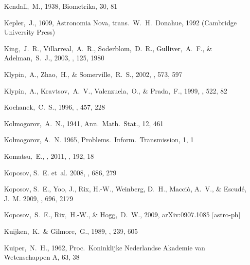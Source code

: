 \begin{thebibliography}{99}
  Kendall,~M., 1938,
  Biometrika, 30, 81

  Kepler,~J., 1609,
  Astronomia Nova,
  trans.\ W.~H.~Donahue, 1992
  (Cambridge University Press)

  King,~J.~R., Villarreal,~A.~R., Soderblom,~D.~R., Gulliver,~A.~F., \& Adelman,~S.~J., 2003,
  \aj, 125, 1980

  Klypin,~A., Zhao,~H., \& Somerville,~R.~S., 2002,
  \apj, 573, 597

  Klypin,~A., Kravtsov,~A.~V., Valenzuela,~O., \& Prada,~F., 1999, \apj, 522, 82

  Kochanek,~C.~S., 1996,
  \apj, 457, 228

  Kolmogorov,~A.~N., 1941,
  Ann.~Math.~Stat., 12, 461

{Kolmogorov}, A.~N. 1965, {Problems.~Inform.~Transmission}, 1, 1

  Komatsu,~E., \etal, 2011, \apjs, 192, 18

{Koposov}, S.~E. {et~al.} 2008, \apj, 686, 279

{Koposov}, S.~E., {Yoo}, J., {Rix}, H.-W., {Weinberg}, D.~H., {Macci{\`o}},
  A.~V., \& {Escud{\'e}}, J.~M. 2009, \apj, 696, 2179

 Koposov,~S.~E., Rix,~H.-W., \& Hogg,~D.~W., 2009, arXiv:0907.1085 [astro-ph]

  Kuijken,~K.~\& Gilmore,~G., 1989, \mnras, 239, 605

  Kuiper,~N.~H., 1962,
  Proc.~Koninklijke Nederlandse Akademie van Wetenschappen A, 63, 38


\end{thebibliography}
